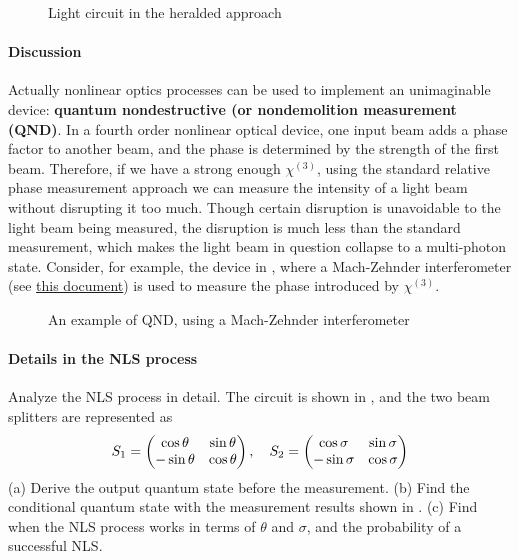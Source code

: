 \documentclass[hyperref, a4paper]{article}
\newcommand*{\concept}[1]{{\textbf{#1}}}
\begin{document}
\begin{figure}
    \centering
    
    \caption{Light circuit in the heralded approach}
    \label{fig:heralded-circuit}
\end{figure}

\paragraph{Discussion} Actually nonlinear optics processes can be used to implement an unimaginable device: \concept{quantum nondestructive (or nondemolition measurement (QND)}.
In a fourth order nonlinear optical device, one input beam adds a phase factor to another beam, 
and the phase is determined by the strength of the first beam.
Therefore, if we have a strong enough $\chi^{(3)}$, using the standard relative phase measurement approach we can measure the 
intensity of a light beam without disrupting it too much. 
Though certain disruption is unavoidable to the light beam being measured, the disruption is much less than the standard measurement,
which makes the light beam in question collapse to a multi-photon state.
Consider, for example, the device in , where a Mach-Zehnder interferometer (see \href{../../quantum-optics/10-21}{this document}) is used to measure the phase introduced by $\chi^{(3)}$. 

\begin{figure}
    \centering
    
    \caption{An example of QND, using a Mach-Zehnder interferometer}
    \label{fig:gnd}
\end{figure}

\paragraph{}

\paragraph{Details in the NLS process} Analyze the NLS process in detail. 
The circuit is shown in , and the two beam splitters are represented as 
\begin{equation}
    S_1 = \pmqty{\cos \theta & \sin \theta \\
    - \sin \theta & \cos \theta}, \quad S_2 = \pmqty{\cos \sigma & \sin \sigma \\
    - \sin \sigma & \cos \sigma}
\end{equation}
(a) Derive the output quantum state before the measurement.
(b) Find the conditional quantum state with the measurement results shown in .
(c) Find when the NLS process works in terms of $\theta$ and $\sigma$, and the probability of a successful NLS.
\end{document}
